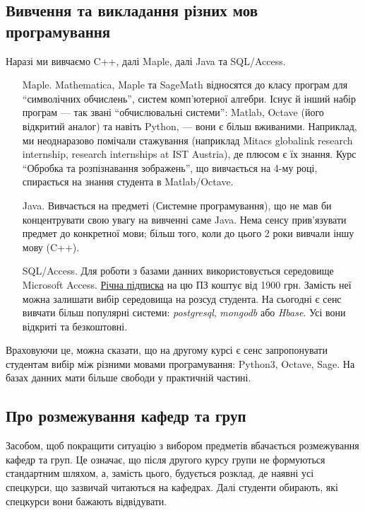 \documentclass[14pt, a4paper]{extarticle}  %
\begin{document}
\subsection{Вивчення та викладання різних мов програмування}
\label{Languages}

Наразі ми вивчаємо C++, далі Maple, далі Java та SQL/Access. 
\begin{itemize}
    \item [Maple.] Mathematica, Maple та SageMath відносятся до класу програм для ``символічних обчислень'', систем комп'ютерної алгебри. Існує й інший набір програм --- так звані ``обчислювальні системи'': Matlab, Octave (його відкритий аналог) та навіть Python, --- вони є більш вживаними. Наприклад, ми неоднаразово помічали стажування (наприклад Mitacs globalink research internship, research internships at IST Austria), де плюсом є їх знання. Курс ``Обробка та розпізнавання зображень'', що вивчається на 4-му році, спирається на знання студента в Matlab/Octave. 
    
    \item [Java.] Вивчається на предметі (Системне програмування), що не мав би концентрувати свою увагу на вивченні саме Java. Нема сенсу прив'я\-зувати предмет до конкретної мови; більш того, коли до цього 2 роки вивчали іншу мову (C++).  
    
    \item [SQL/Access.] Для роботи з базами данних використовується середовище Microsoft Access. \href{https://products.office.com/uk-UA/buy/office}{Річна підписка} на цю ПЗ коштує від 1900 грн. Замість неї можна залишати вибір середовища на розсуд студента. На сьогодні є сенс вивчати більш популярні системи: \textit{postgresql}, \textit{mongodb} або \textit{Hbase}. Усі вони відкриті та безкоштовні. 
\end{itemize}



Враховуючи це, можна сказати, що на другому курсі є сенс запропонувати студентам вибір між різними мовами програмування: Python3, Octave, Sage. 
На базах данних мати більше свободи у практичній частині. 

\subsection{Про розмежування кафедр та груп}
\label{cathedra_demarcation}
Засобом, щоб покращити ситуацію з вибором предметів вбачається розмежування кафедр та груп. Це означає, що після другого курсу групи не формуються стандартним шляхом, а, замість цього, будується розклад, де наявні усі спецкурси, що зазвичай читаються на кафедрах. Далі студенти обирають, які спецкурси вони бажають відвідувати.
\end{document}
